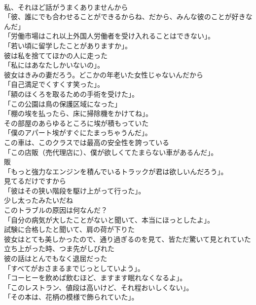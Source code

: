 \documentclass[8pt]{extreport}
\begin{document}
\begin{CJK}{UTF8}{min}
\\	私、それほど話がうまくありませんから	
\\	「彼、誰にでも合わせることができるからね、だから、みんな彼のことが好きなんだ」	
\\	「労働市場はこれ以上外国人労働者を受け入れることはできない」。	
\\	「若い頃に留学したことがありますか」。	
\\	彼は私を捨ててほかの人に走った	
\\	「私にはあなたしかいないの」。	
\\	彼女はきみの妻だろう。どこかの年老いた女性じゃないんだから	
\\	「自己満足でくすくす笑った」。	
\\	「額のほくろを取るための手術を受けた」。	
\\	「この公園は鳥の保護区域になった」	
\\	「棚の埃を払ったら、床に掃除機をかけてね」。	
\\	その部屋のあらゆるところに埃が積もっていた	
\\	「僕のアパート埃がすぐにたまっちゃうんだ」。	
\\	この車は、このクラスでは最高の安全性を誇っている	
\\	「この店販（売代理店に）、僕が欲しくてたまらない車があるんだ」。	
\\	販
\\	「もっと強力なエンジンを積んでいるトラックが君は欲しいんだろう」。	
\\	見てるだけですから	
\\	「彼はその狭い階段を駆け上がって行った」。	
\\	少し太ったみたいだね	
\\	このトラブルの原因は何なんだ？	
\\	「自分の病気が大したことがないと聞いて、本当にほっとしたよ」。	
\\	試験に合格したと聞いて、肩の荷が下りた	
\\	彼女はとても美しかったので、通り過ぎるのを見て、皆ただ驚いて見とれていた	
\\	立ち上がった時、つま先がしびれた	
\\	彼の話はとんでもなく退屈だった	
\\	「すべてがおさまるまでじっとしていよう」。	
\\	「コーヒーを飲めば飲むほど、ますます眠れなくなるよ」。	
\\	「このレストラン、値段は高いけど、それ程おいしくない」。	
\\	「その本は、花柄の模様で飾られていた」。	

\end{CJK}
\end{document}
